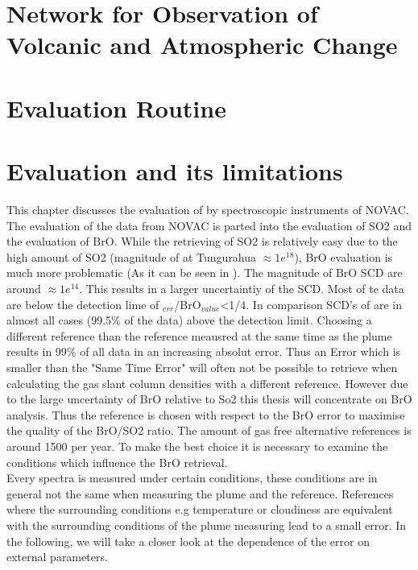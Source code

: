 \documentclass  [
  paper    = a4,
  BCOR     = 10mm,
  twoside,
  fontsize = 12pt,
  fleqn,
  toc      = bibnumbered,
  toc      = listofnumbered,
  numbers  = noendperiod,
  headings = normal,
  listof   = leveldown,
  version  = 3.03
]                                       {scrreprt}
\begin{document}
	
	\chapter{Network for Observation of Volcanic and Atmospheric Change \label{NOVAC}}
	
	
	\chapter{Evaluation Routine}
	
	\chapter{  Evaluation and its limitations}
	This chapter discusses the evaluation of   by spectroscopic instruments of NOVAC.\\
	The evaluation of the data from NOVAC is parted into the evaluation of SO2 and the evaluation of BrO. While the retrieving of SO2 is relatively easy due to the high amount of SO2  (magnitude of  at Tungurahua $\approx 1e^{18}$), BrO evaluation is much more problematic (As it can be seen in ). The magnitude of BrO SCD are around $\approx 1e^{14}$. 
	This results in a larger uncertaintiy of the   SCD. Most of te   data are below the detection lime of $_{err}$/BrO$_{value}$<1/4. In comparison SCD's of   are in almost all cases (99.5\% of the data) above the detection limit. 
	Choosing a different reference than the reference meausred at the same time as the plume results in 99\% of all data in an increasing absolut error. 
	Thus an  Error which is smaller than the "Same Time Error" will often not be possible to retrieve when calculating the gas slant column densities with a different reference. However due to the large uncertainty of BrO relative to So2 this thesis will concentrate on BrO analysis. Thus the reference is chosen with respect to the BrO error to maximise the quality of the BrO/SO2 ratio. The amount of gas free alternative references is around 1500 per year. To make the best choice it is necessary to examine the conditions which influence the BrO retrieval.
	\\
	Every spectra is measured under certain conditions, these conditions are in general not the same when measuring the plume and the reference.
	References where the surrounding conditions e.g temperature or cloudiness are equivalent with the surrounding conditions of the  plume measuring lead to a small error.
	In the following, we will take a closer look at the dependence of the  error on external parameters. 
\end{document}
